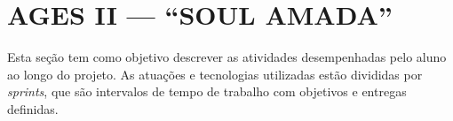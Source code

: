 \chapter[AGES II --- “SOUL AMADA”]{AGES II --- “SOUL AMADA”}

Esta seção tem como objetivo descrever as atividades desempenhadas pelo
aluno ao longo do projeto. As atuações e tecnologias utilizadas estão divididas por
\textit{sprints}, que são intervalos de tempo de trabalho com objetivos e entregas definidas.




